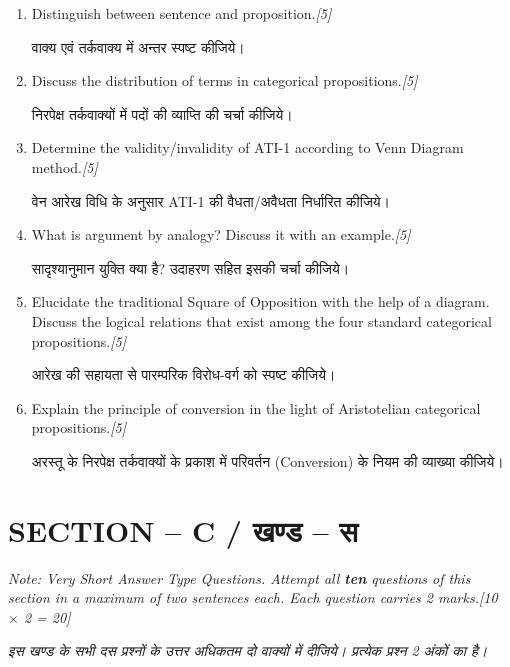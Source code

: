 \documentclass[11pt,a4paper]{article}
\newcommand{\pts}[1]{\hfill \textit{[#1]}}
\begin{document}
\begin{enumerate}[label=\textbf{\arabic*.},leftmargin=*,start=6,itemsep=10pt]

  \item Distinguish between sentence and proposition.\pts{5}
  
  वाक्य एवं तर्कवाक्य में अन्तर स्पष्ट कीजिये।

  \item Discuss the distribution of terms in categorical propositions.\pts{5}
  
  निरपेक्ष तर्कवाक्यों में पदों की व्याप्ति की चर्चा कीजिये।

  \item Determine the validity/invalidity of ATI-1 according to Venn Diagram method.\pts{5}
  
  वेन आरेख विधि के अनुसार ATI-1 की वैधता/अवैधता निर्धारित कीजिये।

  \item What is argument by analogy? Discuss it with an example.\pts{5}
  
  सादृश्यानुमान युक्ति क्या है? उदाहरण सहित इसकी चर्चा कीजिये।

  \item Elucidate the traditional Square of Opposition with the help of a diagram. Discuss the logical relations that exist among the four standard categorical propositions.\pts{5}
  
  आरेख की सहायता से पारम्परिक विरोध-वर्ग को स्पष्ट कीजिये।

  \item Explain the principle of conversion in the light of Aristotelian categorical propositions.\pts{5}
  
  अरस्तू के निरपेक्ष तर्कवाक्यों के प्रकाश में परिवर्तन (Conversion) के नियम की व्याख्या कीजिये।

\end{enumerate}

\bigskip

\section*{SECTION -- C / खण्ड -- स}
\noindent \textit{Note: Very Short Answer Type Questions. Attempt all \textbf{ten} questions of this section in a maximum of two sentences each. Each question carries 2 marks.}\pts{10 $\times$ 2 = 20}

\noindent \textit{इस खण्ड के सभी दस प्रश्नों के उत्तर अधिकतम दो वाक्यों में दीजिये। प्रत्येक प्रश्न 2 अंकों का है।}
\end{document}
